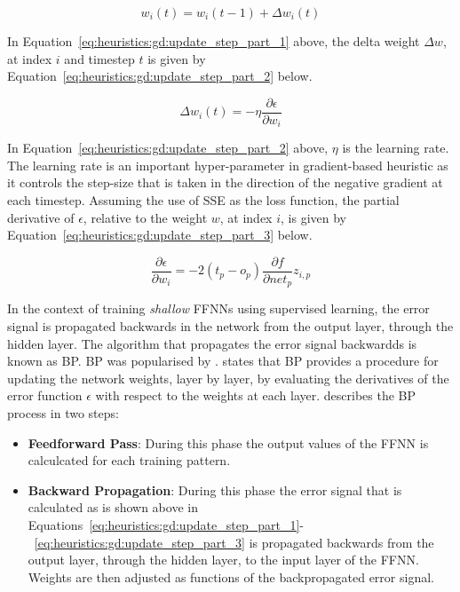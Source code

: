 \begin{equation}
      \label{eq:heuristics:gd:update_step_part_1}
      w_{i}(t) = w_{i}(t-1) + \Delta w_{i}(t)
\end{equation}

\noindent
In Equation~\eqref{eq:heuristics:gd:update_step_part_1} above, the delta weight $\Delta w$, at index $i$ and timestep $t$ is given by Equation~\eqref{eq:heuristics:gd:update_step_part_2} below.

\begin{equation}
      \label{eq:heuristics:gd:update_step_part_2}
      \Delta w_{i}(t) = -\eta\frac{\partial \epsilon}{\partial w_{i}}
\end{equation}

\noindent
In Equation~\eqref{eq:heuristics:gd:update_step_part_2} above, $\eta$ is the learning rate. The learning rate is an important hyper-parameter in gradient-based heuristic as it controls the step-size that is taken in the direction of the negative gradient at each timestep. Assuming the use of \acs{SSE} as the loss function, the partial derivative of $\epsilon$, relative to the weight $w$, at index $i$, is given by Equation~\eqref{eq:heuristics:gd:update_step_part_3} below.

\begin{equation}
      \label{eq:heuristics:gd:update_step_part_3}
      \frac{\partial \epsilon}{\partial w_{i}} = -2(t_{p} - o_{p})\frac{\partial f}{\partial net_{p}}z_{i,p}
\end{equation}

\noindent
In the context of training \textit{shallow} \acp{FFNN} using supervised learning, the error signal is propagated backwards in the network from the output layer, through the hidden layer. The algorithm that propagates the error signal backwardds is known as \acf{BP}. \Acs{BP} was popularised by \citeauthor{ref:werbos:1994} \cite{ref:werbos:1994}. \citeauthor{ref:nel:2021} \cite{ref:nel:2021} states that \acs{BP} provides a procedure for updating the network weights, layer by layer, by evaluating the derivatives of the error function $\epsilon$ with respect to the weights at each layer. \citeauthor{ref:engelbrecht:2007} \cite{ref:engelbrecht:2007}describes the \acs{BP} process in two steps:

\begin{itemize}
      \item \textbf{Feedforward Pass}: During this phase the output values of the \acs{FFNN} is calculcated for each training pattern.
      \item \textbf{Backward Propagation}: During this phase the error signal that is calculated as is shown above in Equations~\eqref{eq:heuristics:gd:update_step_part_1}-~\eqref{eq:heuristics:gd:update_step_part_3} is propagated backwards from the output layer, through the hidden layer, to the input layer of the \ac{FFNN}. Weights are then adjusted as functions of the backpropagated error signal.
\end{itemize}


